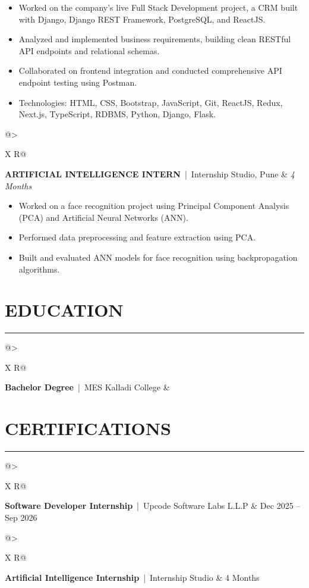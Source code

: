 \documentclass[a4paper,9pt]{article}
\makeatletter
\newcommand{\sectionline}{
    \vspace{0pt}
    \hrule
    \vspace{1.5pt}
}
\newcommand{\experienceheading}[3]{
    \noindent
    \begin{tabularx}{\textwidth}{@{}>{\raggedright\arraybackslash}X R@{}}
        \textbf{#1} \,|\, #2
        &
        \textit{#3}
    \end{tabularx}
    \vspace{-2pt}
}
\newcommand{\certheading}[3]{
    \noindent
    \begin{tabularx}{\textwidth}{@{}>{\raggedright\arraybackslash}X R@{}}
        \textbf{#1} \,|\, #2
        &
        #3
    \end{tabularx}
}
\makeatother
\begin{document}
\begin{itemize}
    \item Worked on the company's live Full Stack Development project, a CRM built with Django, Django REST Framework, PostgreSQL, and ReactJS.
    \item Analyzed and implemented business requirements, building clean RESTful API endpoints and relational schemas.
    \item Collaborated on frontend integration and conducted comprehensive API endpoint testing using Postman.
    \item Technologies: HTML, CSS, Bootstrap, JavaScript, Git, ReactJS, Redux, Next.js, TypeScript, RDBMS, Python, Django, Flask.
\end{itemize}

\experienceheading
{ARTIFICIAL INTELLIGENCE INTERN}
{Internship Studio, Pune}
{4 Months}

\begin{itemize}
    \item Worked on a face recognition project using Principal Component Analysis (PCA) and Artificial Neural Networks (ANN).
    \item Performed data preprocessing and feature extraction using PCA.
    \item Built and evaluated ANN models for face recognition using backpropagation algorithms.
\end{itemize}


\section*{EDUCATION}
\sectionline

\noindent
\begin{tabularx}{\textwidth}{@{}>{\raggedright\arraybackslash}X R@{}}
    \textbf{Bachelor Degree} \,|\, MES Kalladi College
    &
\end{tabularx}


\section*{CERTIFICATIONS}
\sectionline

\certheading
{Software Developer Internship}
{Upcode Software Labs L.L.P}
{Dec 2025 -- Sep 2026}

\certheading
{Artificial Intelligence Internship}
{Internship Studio}
{4 Months}

\end{document}
